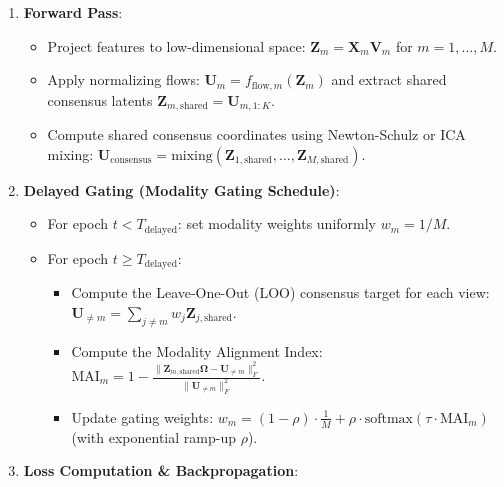 \documentclass[
  letterpaper,
]{report}
\providecommand{\tightlist}{%
  \setlength{\itemsep}{0pt}\setlength{\parskip}{0pt}}
\begin{document}
\begin{enumerate}
\def\labelenumi{\arabic{enumi}.}
\tightlist
\item
  \textbf{Forward Pass}:

  \begin{itemize}
  \tightlist
  \item
    Project features to low-dimensional space:
    \(\mathbf{Z}_m = \mathbf{X}_m \mathbf{V}_m\) for \(m=1, \dots, M\).
  \item
    Apply normalizing flows:
    \(\mathbf{U}_m = f_{\text{flow}, m}(\mathbf{Z}_m)\) and extract
    shared consensus latents
    \(\mathbf{Z}_{m, \text{shared}} = \mathbf{U}_{m, 1:K}\).
  \item
    Compute shared consensus coordinates using Newton-Schulz or ICA
    mixing:
    \(\mathbf{U}_{\text{consensus}} = \text{mixing}(\mathbf{Z}_{1, \text{shared}}, \dots, \mathbf{Z}_{M, \text{shared}})\).
  \end{itemize}
\item
  \textbf{Delayed Gating (Modality Gating Schedule)}:

  \begin{itemize}
  \tightlist
  \item
    For epoch \(t < T_{\text{delayed}}\): set modality weights uniformly
    \(w_m = 1/M\).
  \item
    For epoch \(t \ge T_{\text{delayed}}\):

    \begin{itemize}
    \tightlist
    \item
      Compute the Leave-One-Out (LOO) consensus target for each view:
      \(\mathbf{U}_{\neq m} = \sum_{j \neq m} w_j \mathbf{Z}_{j, \text{shared}}\).
    \item
      Compute the Modality Alignment Index:
      \(\text{MAI}_m = 1 - \frac{\|\mathbf{Z}_{m, \text{shared}}\mathbf{\Omega} - \mathbf{U}_{\neq m}\|_F^2}{\|\mathbf{U}_{\neq m}\|_F^2}\).
    \item
      Update gating weights:
      \(w_m = (1 - \rho) \cdot \frac{1}{M} + \rho \cdot \text{softmax}(\tau \cdot \text{MAI}_m)\)
      (with exponential ramp-up \(\rho\)).
    \end{itemize}
  \end{itemize}
\item
  \textbf{Loss Computation \& Backpropagation}:


\end{enumerate}
\end{document}
